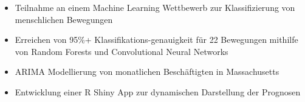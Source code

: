 
\begin{itemize}
    \item Teilnahme an einem Machine Learning Wettbewerb zur Klassifizierung von menschlichen Bewegungen %
    \item Erreichen von 95\%+ Klassifikations-genauigkeit für  22 Bewegungen mithilfe von Random Forests und Convolutional Neural Networks
\end{itemize}

\divider

\begin{itemize}
    \item ARIMA Modellierung von monatlichen Beschäftigten in Massachusetts
    \item Entwicklung einer R Shiny App zur dynamischen Darstellung der Prognosen
\end{itemize}







\newline \vspace{6px}


